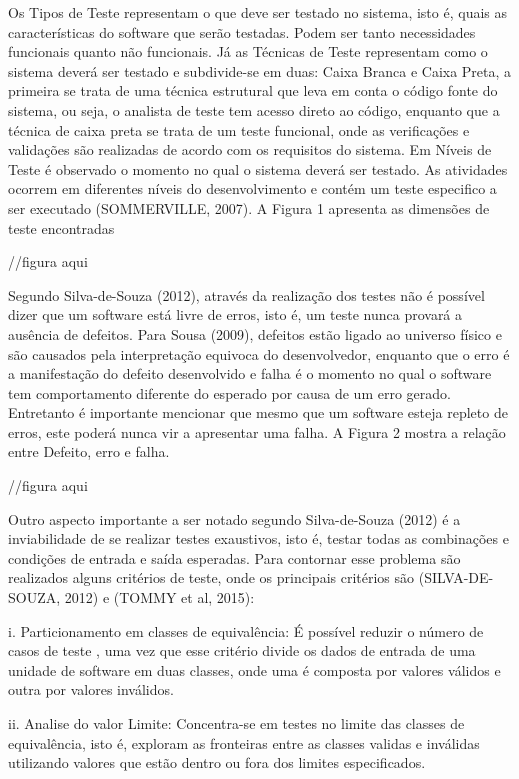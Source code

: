 Os Tipos de Teste representam o que deve ser testado no sistema, isto é, quais as características do software que serão testadas. Podem ser tanto necessidades funcionais quanto não funcionais. Já as Técnicas de Teste representam como o sistema deverá ser testado e subdivide-se em duas: Caixa Branca e Caixa Preta, a primeira se trata de uma técnica estrutural que leva em conta o código fonte do sistema, ou seja, o analista de teste tem acesso direto ao código, enquanto que a técnica de caixa preta se trata de um teste funcional, onde as verificações e validações são realizadas de acordo com os requisitos do sistema. Em Níveis de Teste é observado o momento no qual o sistema deverá ser testado. As atividades ocorrem em diferentes níveis do desenvolvimento e contém um teste especifico a ser executado (SOMMERVILLE, 2007). A Figura 1 apresenta as dimensões de teste encontradas

//figura aqui

Segundo Silva-de-Souza (2012), através da realização dos testes não é possível dizer que um software está livre de erros, isto é, um teste nunca provará a ausência de defeitos. Para Sousa (2009), defeitos estão ligado ao universo físico e são causados pela interpretação equivoca do desenvolvedor, enquanto que o erro é a manifestação do defeito desenvolvido e falha é o momento no qual o software tem comportamento diferente do esperado por causa de um erro gerado. Entretanto é importante mencionar que mesmo que um software esteja repleto de erros, este poderá nunca vir a apresentar uma falha. A Figura 2 mostra a relação entre Defeito, erro e falha.

//figura aqui

Outro aspecto importante a ser notado segundo Silva-de-Souza (2012) é a inviabilidade de se realizar testes exaustivos, isto é, testar todas as combinações e condições de entrada e saída esperadas. Para contornar esse problema são realizados alguns critérios de teste, onde os principais critérios são (SILVA-DE-SOUZA, 2012) e (TOMMY et al, 2015):

i.	Particionamento em classes de equivalência: É possível reduzir o número de casos de teste , uma vez que esse critério divide os dados de entrada de uma unidade de software em duas classes, onde uma é composta por valores válidos e outra por valores inválidos. 


ii.	Analise do valor Limite: Concentra-se em testes no limite das classes de equivalência, isto é, exploram as fronteiras entre as classes validas e inválidas utilizando valores que estão dentro ou fora dos limites especificados. 


